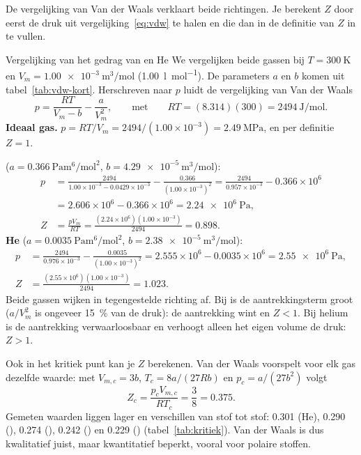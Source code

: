 De vergelijking van Van der Waals verklaart beide richtingen. Je berekent $Z$ door eerst de druk uit vergelijking~\eqref{eq:vdw} te halen en die dan in de definitie van $Z$ in te vullen.

\begin{voorbeeld}{Vergelijking van het gedrag van  en He}
We vergelijken beide gassen bij $T = \SI{300}{\kelvin}$ en $V_m = \SI{1.00e-3}{\metre\cubed\per\mole}$ (\SI{1.00}{\litre\per\mole}). De parameters $a$ en $b$ komen uit tabel~\ref{tab:vdw-kort}. Herschreven naar $p$ luidt de vergelijking van Van der Waals
\[
p = \frac{RT}{V_m - b} - \frac{a}{V_m^2},
\qquad\text{met}\qquad RT = (8.314)(300) = \SI{2494}{\joule\per\mole}.
\]
\textbf{Ideaal gas.} $p = RT/V_m = 2494/(1.00\times10^{-3}) = \SI{2.49}{\mega\pascal}$, en per definitie $Z = 1$.

\textbf{} ($a = \SI{0.366}{\pascal\metre\tothe{6}\per\mole\squared}$, $b = \SI{4.29e-5}{\metre\cubed\per\mole}$):
\begin{align*}
p &= \frac{2494}{1.00\times10^{-3} - 0.0429\times10^{-3}} - \frac{0.366}{(1.00\times10^{-3})^2}
   = \frac{2494}{0.957\times10^{-3}} - 0.366\times10^{6}\\
  &= 2.606\times10^{6} - 0.366\times10^{6} = \SI{2.24e6}{\pascal},\\
Z &= \frac{pV_m}{RT} = \frac{(2.24\times10^{6})(1.00\times10^{-3})}{2494} = 0.898.
\end{align*}
\textbf{He} ($a = \SI{0.0035}{\pascal\metre\tothe{6}\per\mole\squared}$, $b = \SI{2.38e-5}{\metre\cubed\per\mole}$):
\begin{align*}
p &= \frac{2494}{0.976\times10^{-3}} - \frac{0.0035}{(1.00\times10^{-3})^2}
   = 2.555\times10^{6} - 0.0035\times10^{6} = \SI{2.55e6}{\pascal},\\
Z &= \frac{(2.55\times10^{6})(1.00\times10^{-3})}{2494} = 1.023.
\end{align*}
Beide gassen wijken in tegengestelde richting af. Bij  is de aantrekkingsterm groot ($a/V_m^2$ is ongeveer \SI{15}{\percent} van de druk): de aantrekking wint en $Z < 1$. Bij helium is de aantrekking verwaarloosbaar en verhoogt alleen het eigen volume de druk: $Z > 1$.
\end{voorbeeld}

Ook in het kritiek punt kan je $Z$ berekenen. Van der Waals voorspelt voor elk gas dezelfde waarde: met $V_{m,c} = 3b$, $T_c = 8a/(27Rb)$ en $p_c = a/(27b^2)$ volgt
\[
Z_c = \frac{p_c V_{m,c}}{RT_c} = \frac{3}{8} = 0.375.
\]
Gemeten waarden liggen lager en verschillen van stof tot stof: 0.301 (He), 0.290 (), 0.274 (), 0.242 () en 0.229 () (tabel~\ref{tab:kritiek}). Van der Waals is dus kwalitatief juist, maar kwantitatief beperkt, vooral voor polaire stoffen.


